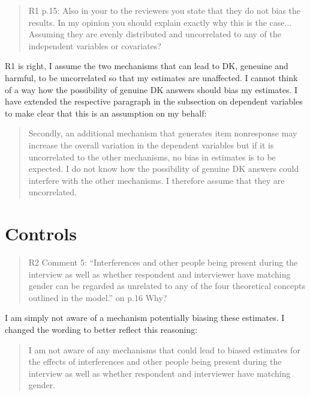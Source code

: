 \documentclass[a4paper, 12pt]{article}
\begin{document}
\begin{quotation}
R1 p.15: Also in your to the reviewers you state that they do not bias the results. In my opinion you should explain exactly why this is the case...
Assuming they are evenly distributed and uncorrelated to any of the independent variables or covariates?
\end{quotation}

R1 is right, I assume the two mechanisms that can lead to DK, geneuine and harmful, to be uncorrelated so that my estimates are unaffected. I cannot think of a way how the possibility of genuine DK answers should bias my estimates. I have extended the respective paragraph in the subsection on dependent variables to make clear that this is an assumption on my behalf:

\begin{quotation}
Secondly, an additional mechanism that generates item nonresponse may increase the overall variation in the dependent variables but if it is uncorrelated to the other mechanisms, no bias in estimates is to be expected. I do not know how the possibility of genuine DK answers could interfere with the other mechanisms. I therefore assume that they are uncorrelated.
\end{quotation}

\section{Controls}

\begin{quotation}
R2 Comment 5: “Interferences and other people being present during the interview as well as whether respondent and interviewer have matching gender can be regarded as unrelated to any of the four theoretical concepts outlined in the model.” on p.16 Why?
\end{quotation}

I am simply not aware of a mechanism potentially biasing these estimates. I changed the wording to better reflect this reasoning:

\begin{quotation}
I am not aware of any mechanisms that could lead to biased estimates for the effects of interferences and other people being present during the interview as well as whether respondent and interviewer have matching gender.
\end{quotation}
\end{document}
